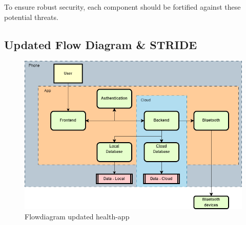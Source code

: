 To ensure robust security, each component should be fortified against these potential threats.

\subsection{Updated Flow Diagram \& STRIDE}

\begin{figure}[H]
    \centering
    \includegraphics[width=0.9\linewidth]{pic/Flowdiagram updated.png}
    \caption{Flowdiagram updated health-app}
    \label{fig:Flowdiagram updated health-app}
\end{figure}



